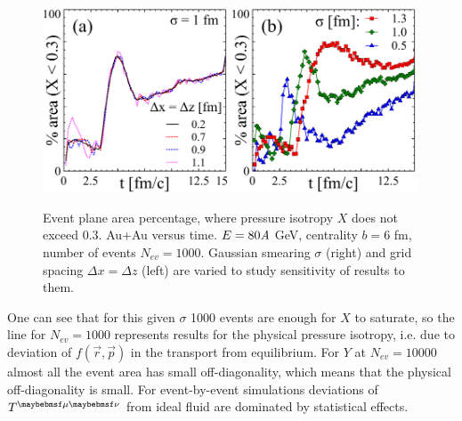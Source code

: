 \begin{figure}
  \includegraphics[width = 0.49\textwidth]{plots/thermalization_urqmd/grid_size_sensitivity.pdf}
  \includegraphics[width = 0.49\textwidth]{plots/thermalization_urqmd/sigma_sensitivity.pdf}
  \caption{Event plane area percentage, where pressure isotropy $X$ does not
           exceed 0.3. Au+Au versus time. $E = 80\emph{A}$ GeV, centrality $b = 6$ fm,
           number of events $N_{ev} = 1000$. Gaussian smearing $\sigma$ (right) and grid
           spacing $\Delta x = \Delta z$ (left) are varied to study sensitivity of results
           to them.}
  \label{FIG:sensitivity_sigma_dx}
\end{figure}

One can see that for this given $\sigma$ 1000 events are enough for $X$ to
saturate, so the line for $N_{ev} = 1000$ represents results for the physical
pressure isotropy, i.e. due to deviation of $\mathit{f}(\vec{r},\vec{p})$ in the
transport from equilibrium. For $Y$ at $N_{ev} = 10000$ almost all the event
area has small off-diagonality, which means that the physical off-diagonality is
small. For event-by-event simulations deviations of $\Tmn$ from ideal fluid are
dominated by statistical effects.

